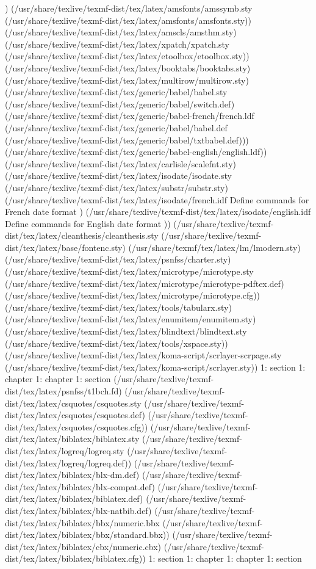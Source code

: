 ) (/usr/share/texlive/texmf-dist/tex/latex/amsfonts/amssymb.sty
(/usr/share/texlive/texmf-dist/tex/latex/amsfonts/amsfonts.sty))
(/usr/share/texlive/texmf-dist/tex/latex/amscls/amsthm.sty)
(/usr/share/texlive/texmf-dist/tex/latex/xpatch/xpatch.sty
(/usr/share/texlive/texmf-dist/tex/latex/etoolbox/etoolbox.sty))
(/usr/share/texlive/texmf-dist/tex/latex/booktabs/booktabs.sty)
(/usr/share/texlive/texmf-dist/tex/latex/multirow/multirow.sty)
(/usr/share/texlive/texmf-dist/tex/generic/babel/babel.sty
(/usr/share/texlive/texmf-dist/tex/generic/babel/switch.def)
(/usr/share/texlive/texmf-dist/tex/generic/babel-french/french.ldf
(/usr/share/texlive/texmf-dist/tex/generic/babel/babel.def
(/usr/share/texlive/texmf-dist/tex/generic/babel/txtbabel.def)))
(/usr/share/texlive/texmf-dist/tex/generic/babel-english/english.ldf))
(/usr/share/texlive/texmf-dist/tex/latex/carlisle/scalefnt.sty)
(/usr/share/texlive/texmf-dist/tex/latex/isodate/isodate.sty
(/usr/share/texlive/texmf-dist/tex/latex/substr/substr.sty)
(/usr/share/texlive/texmf-dist/tex/latex/isodate/french.idf
Define commands for French date format
) (/usr/share/texlive/texmf-dist/tex/latex/isodate/english.idf
Define commands for English date format
)) (/usr/share/texlive/texmf-dist/tex/latex/cleanthesis/cleanthesis.sty
(/usr/share/texlive/texmf-dist/tex/latex/base/fontenc.sty)
(/usr/share/texmf/tex/latex/lm/lmodern.sty)
(/usr/share/texlive/texmf-dist/tex/latex/psnfss/charter.sty)
(/usr/share/texlive/texmf-dist/tex/latex/microtype/microtype.sty
(/usr/share/texlive/texmf-dist/tex/latex/microtype/microtype-pdftex.def)
(/usr/share/texlive/texmf-dist/tex/latex/microtype/microtype.cfg))
(/usr/share/texlive/texmf-dist/tex/latex/tools/tabularx.sty)
(/usr/share/texlive/texmf-dist/tex/latex/enumitem/enumitem.sty)
(/usr/share/texlive/texmf-dist/tex/latex/blindtext/blindtext.sty
(/usr/share/texlive/texmf-dist/tex/latex/tools/xspace.sty))
(/usr/share/texlive/texmf-dist/tex/latex/koma-script/scrlayer-scrpage.sty
(/usr/share/texlive/texmf-dist/tex/latex/koma-script/scrlayer.sty))
1: section
1: chapter
1: chapter
1: section
(/usr/share/texlive/texmf-dist/tex/latex/psnfss/t1bch.fd)
(/usr/share/texlive/texmf-dist/tex/latex/csquotes/csquotes.sty
(/usr/share/texlive/texmf-dist/tex/latex/csquotes/csquotes.def)
(/usr/share/texlive/texmf-dist/tex/latex/csquotes/csquotes.cfg))
(/usr/share/texlive/texmf-dist/tex/latex/biblatex/biblatex.sty
(/usr/share/texlive/texmf-dist/tex/latex/logreq/logreq.sty
(/usr/share/texlive/texmf-dist/tex/latex/logreq/logreq.def))
(/usr/share/texlive/texmf-dist/tex/latex/biblatex/blx-dm.def)
(/usr/share/texlive/texmf-dist/tex/latex/biblatex/blx-compat.def)
(/usr/share/texlive/texmf-dist/tex/latex/biblatex/biblatex.def)
(/usr/share/texlive/texmf-dist/tex/latex/biblatex/blx-natbib.def)
(/usr/share/texlive/texmf-dist/tex/latex/biblatex/bbx/numeric.bbx
(/usr/share/texlive/texmf-dist/tex/latex/biblatex/bbx/standard.bbx))
(/usr/share/texlive/texmf-dist/tex/latex/biblatex/cbx/numeric.cbx)
(/usr/share/texlive/texmf-dist/tex/latex/biblatex/biblatex.cfg))
1: section
1: chapter
1: chapter
1: section

